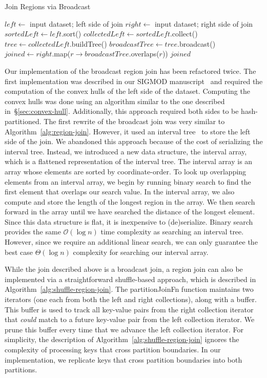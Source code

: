 \documentclass[phd]{ucbthesis}
\begin{document}
\begin{algorithm}
\caption{Join Regions via Broadcast}
\label{alg:region-join}
\begin{algorithmic}
\STATE $left \leftarrow$ input dataset; left side of join
\STATE $right \leftarrow$ input dataset; right side of join
\STATE $sortedLeft \leftarrow left$.sort()
\STATE $collectedLeft \leftarrow sortedLeft$.collect()
\STATE $tree \leftarrow collectedLeft$.buildTree()
\STATE $broadcastTree \leftarrow tree$.broadcast()
\STATE $joined \leftarrow right$.map($r \rightarrow broadcastTree$.overlaps($r$))
\RETURN $joined$
\end{algorithmic}
\end{algorithm}

Our implementation of the broadcast region join has been refactored twice. The
first implementation was described in our SIGMOD manuscript~\cite{nothaft15} and
required the computation of the convex hulls of the left side of the dataset.
Computing the convex hulls was done using an algorithm similar to the one described
in~\S\ref{sec:convex-hull}. Additionally, this approach required both sides to
be hash-partitioned. The first rewrite of the broadcast join was very similar to
Algorithm~\ref{alg:region-join}. However, it used an interval
tree~\cite{samet90} to store the left side of the join. We abandoned this
approach because of the cost of serializing the interval tree. Instead, we
introduced a new data structure, the interval array, which is a flattened
representation of the interval tree. The interval array is an array whose
elements are sorted by coordinate-order. To look up overlapping elements from an
interval array, we begin by running binary search to find the first element that
overlaps our search value. In the interval array, we also compute and store the
length of the longest region in the array. We then search forward in the array
until we have searched the distance of the longest element. Since this data
structure is flat, it is inexpensive to (de)serialize. Binary search provides
the same $\mathcal{O}(\log n)$ time complexity as searching an interval
tree. However, since we require an additional linear search, we can only
guarantee the best case $\Theta(\log n)$ complexity for searching our
interval array.

While the join described above is a broadcast join, a region join can also be
implemented via a straightforward shuffle-based approach, which is described in
Algorithm~\ref{alg:shuffle-region-join}. The {partitionJoinFn} function
maintains two iterators (one each from both the left and right collections),
along with a buffer. This buffer is used to track all key-value pairs from the
right collection iterator that \emph{could} match to a future key-value pair
from the left collection iterator. We prune this buffer every time that we
advance the left collection iterator. For simplicity, the description of
Algorithm~\ref{alg:shuffle-region-join} ignores the complexity of processing
keys that cross partition boundaries. In our implementation, we replicate keys
that cross partition boundaries into both partitions.
\end{document}
